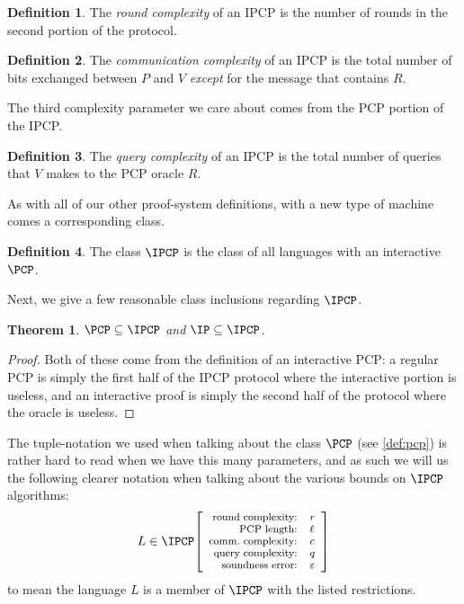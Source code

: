 \documentclass[english,12pt]{reedthesis}
\theoremstyle{plain}
\newtheorem{thm}{Theorem}[section]
\theoremstyle{definition}
\newtheorem{defn}[defn]{Definition}
\theoremstyle{remark}
\newcommand{\ipcp}[5]{%
  \ensuremath%
  \mleft[{\footnotesize\begin{array}{r l}
    \text{round complexity:} & #1 \\
    \text{PCP length:} & #2 \\
    \text{comm.\ complexity:} & #3 \\
    \text{query complexity:} & #4 \\
    \text{soundness error:} & #5
  \end{array}}\mright]%
}
\begin{document}
\begin{defn}\label{def:ipcp-round-complexity}
  The \emph{round complexity} of an IPCP is the number of rounds in the second
  portion of the protocol.
\end{defn}

\begin{defn}\label{def:ipcp-comm-complexity}
  The \emph{communication complexity} of an IPCP is the total number of bits
  exchanged between $P$ and $V$ \emph{except} for the message that contains $R$.
\end{defn}

The third complexity parameter we care about comes from the PCP portion of the
IPCP\@.

\begin{defn}
  The \emph{query complexity} of an IPCP is the total number of queries that $V$
  makes to the PCP oracle $R$.
\end{defn}

As with all of our other proof-system definitions, with a new type of machine
comes a corresponding class.

\begin{defn}\label{def:ipcp-class}
  The class $\IPCP$ is the class of all languages with an interactive $\PCP$.
\end{defn}

Next, we give a few reasonable class inclusions regarding $\IPCP$.

\begin{thm}
  $\PCP \subseteq \IPCP$ and $\IP \subseteq \IPCP$.
\end{thm}

\begin{proof}
  Both of these come from the definition of an interactive PCP: a regular PCP is
  simply the first half of the IPCP protocol where the interactive portion is
  useless, and an interactive proof is simply the second half of the protocol
  where the oracle is useless.
\end{proof}

The tuple-notation we used when talking about the class $\PCP$ (see
\cref{def:pcp}) is rather hard to read when we have this many parameters, and as
such we will us the following clearer notation when talking about the various
bounds on $\IPCP$ algorithms:
\begin{equation*}
  L \in \IPCP\ipcp{r}{\ell}{c}{q}{\varepsilon}
\end{equation*}
to mean the language $L$ is a member of $\IPCP$ with the listed restrictions.
\end{document}
